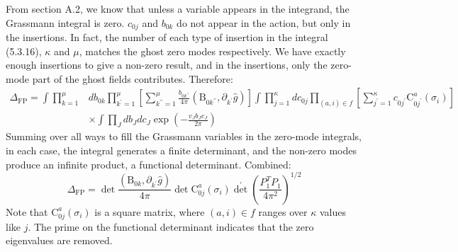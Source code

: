From section A.2, we know that unless a variable appears in the integrand, the Grassmann integral is zero. $c_{0 j}$ and $b_{0 k}$ do not appear in the action, but only in the insertions. In fact, the number of each type of insertion in the integral (5.3.16), $\kappa$ and $\mu$, matches the ghost zero modes respectively. We have exactly enough insertions to give a non-zero result, and in the insertions, only the zero-mode part of the ghost fields contributes. Therefore:
\begin{equation}
	\begin{aligned}
		\Delta_{\mathrm{FP}}=\int \prod_{k=1}^{\mu} & d b_{0 k} \prod_{k^{\prime}=1}^{\mu}\left[\sum_{k^{\prime \prime}=1}^{\mu} \frac{b_{0 k^{\prime \prime}}}{4 \pi}\left(\mathrm{B}_{0 k^{\prime \prime}}, \partial_{k^{\prime}} \hat{g}\right)\right] \int \prod_{j=1}^{\kappa} d c_{0 j} \prod_{(a, i) \in f}\left[\sum_{j^{\prime}=1}^{\kappa} c_{0 j^{\prime}} \mathrm{C}_{0 j^{\prime}}^{a}\left(\sigma_{i}\right)\right] \\
		& \times \int \prod_{J} d b_{J} d c_{J} \exp \left(-\frac{v_{J} b_{J} c_{J}}{2 \pi}\right)
	\end{aligned}
\end{equation}
Summing over all ways to fill the Grassmann variables in the zero-mode integrals, in each case, the integral generates a finite determinant, and the non-zero modes produce an infinite product, a functional determinant. Combined:
\begin{equation}
	\Delta_{\mathrm{FP}}=\operatorname{det} \frac{\left(\mathrm{B}_{0 k}, \partial_{k^{\prime}} \hat{g}\right)}{4 \pi} \operatorname{det} \mathrm{C}_{0 j}^{a}\left(\sigma_{i}\right) \operatorname{det}^{\prime}\left(\frac{P_{1}^{T} P_{1}}{4 \pi^{2}}\right)^{1 / 2}
\end{equation}
Note that $\mathrm{C}_{0 j}^{a}\left(\sigma_{i}\right)$ is a square matrix, where $(a, i) \in f$ ranges over $\kappa$ values like $j$. The prime on the functional determinant indicates that the zero eigenvalues are removed.

